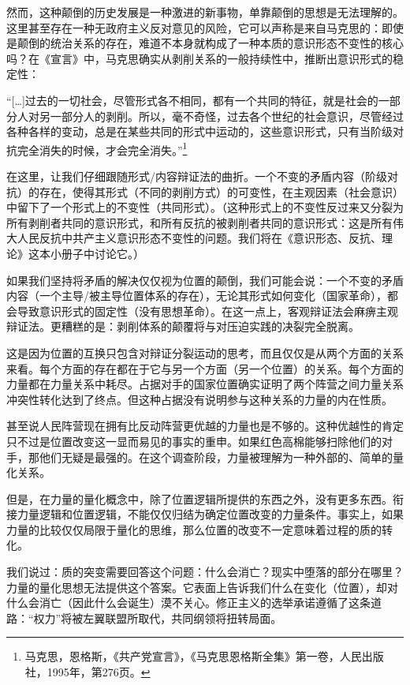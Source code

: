 \documentclass[fontset=fandol, a4paper, 12pt, twoside]{ctexart}
\renewenvironment{quote}
  {\list{}{\rightmargin=0cm \leftmargin=2em}%
   \item\relax\small\kaishu\color{black}}
  {\endlist}
\begin{document}
然而，这种颠倒的历史发展是一种激进的新事物，单靠颠倒的思想是无法理解的。这里甚至存在一种无政府主义反对意见的风险，它可以声称是来自马克思的：即使是颠倒的统治关系的存在，难道不本身就构成了一种本质的意识形态不变性的核心吗？在《宣言》中，马克思确实从剥削关系的一般持续性中，推断出意识形式的稳定性：

\begin{quote}
“[…]过去的一切社会，尽管形式各不相同，都有一个共同的特征，就是社会的一部分人对另一部分人的剥削。所以，毫不奇怪，过去各个世纪的社会意识，尽管经过各种各样的变动，总是在某些共同的形式中运动的，这些意识形式，只有当阶级对抗完全消失的时候，才会完全消失。”\footnote{马克思，恩格斯，《共产党宣言》，《马克思恩格斯全集》第一卷，人民出版社，1995年，第276页。}
\end{quote}

在这里，让我们仔细跟随形式/内容辩证法的曲折。一个不变的矛盾内容（阶级对抗）的存在，使得其形式（不同的剥削方式）的可变性，在主观因素（社会意识）中留下了一个形式上的不变性（共同形式）。（这种形式上的不变性反过来又分裂为所有剥削者共同的意识形式，和所有反抗的被剥削者共同的意识形式：这是所有伟大人民反抗中共产主义意识形态不变性的问题。我们将在《意识形态、反抗、理论》这本小册子中讨论它。）

如果我们坚持将矛盾的解决仅仅视为位置的颠倒，我们可能会说：一个不变的矛盾内容（一个主导/被主导位置体系的存在），无论其形式如何变化（国家革命），都会导致意识形式的固定性（没有思想革命）。在这一点上，客观辩证法会麻痹主观辩证法。更糟糕的是：剥削体系的颠覆将与对压迫实践的决裂完全脱离。

这是因为位置的互换只包含对辩证分裂运动的思考，而且仅仅是从两个方面的关系来看。每个方面的存在都在于它与另一个方面（另一个位置）的关系。每个方面的力量都在力量关系中耗尽。占据对手的国家位置确实证明了两个阵营之间力量关系冲突性转化达到了终点。但这种占据没有说明参与这种关系的力量的内在性质。

甚至说人民阵营现在拥有比反动阵营更优越的力量也是不够的。这种优越性的肯定只不过是位置改变这一显而易见的事实的重申。如果红色高棉能够扫除他们的对手，那他们无疑是最强的。在这个调查阶段，力量被理解为一种外部的、简单的量化关系。

但是，在力量的量化概念中，除了位置逻辑所提供的东西之外，没有更多东西。衔接力量逻辑和位置逻辑，不能仅仅归结为确定位置改变的力量条件。事实上，如果力量的比较仅仅局限于量化的思维，那么位置的改变不一定意味着过程的质的转化。

我们说过：质的突变需要回答这个问题：什么会消亡？现实中堕落的部分在哪里？力量的量化思想无法提供这个答案。它表面上告诉我们什么在变化（位置），却对什么会消亡（因此什么会诞生）漠不关心。修正主义的选举承诺遵循了这条道路：“权力”将被左翼联盟所取代，共同纲领将扭转局面。
\end{document}
